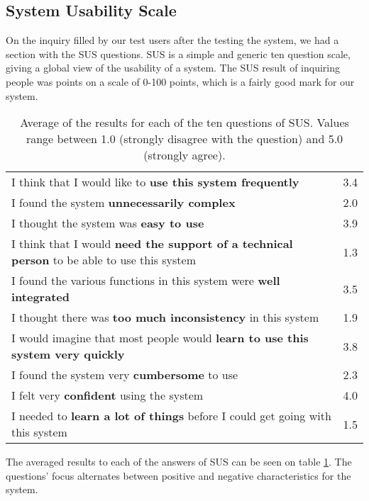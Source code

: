\subsection{System Usability Scale}

On the inquiry filled by our test users after the testing the system, we had a section with the \acf{SUS} questions. \ac{SUS}\cite{Brooke:1996ua} is a simple and generic ten question scale, giving a global view of the usability of a system. The \ac{SUS} result of inquiring  people was  points on a scale of 0-100 points, which is a fairly good mark for our system.

\begin{table}
	\renewcommand{\arraystretch}{1.5}
	\centering
\begin{tabular}{l|c}
I think that I would like to \textbf{use this system frequently} & 3.4\\
I found the system \textbf{unnecessarily complex} & 2.0\\
I thought the system was \textbf{easy to use} & 3.9\\
I think that I would \textbf{need the support of a technical person} to be able to use this system & 1.3\\
I found the various functions in this system were \textbf{well integrated} & 3.5\\
I thought there was \textbf{too much inconsistency} in this system & 1.9\\
I would imagine that most people would \textbf{learn to use this system very quickly} & 3.8\\
I found the system very \textbf{cumbersome} to use & 2.3\\
I felt very \textbf{confident} using the system & 4.0\\
I needed to \textbf{learn a lot of things} before I could get going with this system & 1.5\\
\end{tabular}
\caption{Average of the results for each of the ten questions of \ac{SUS}. Values range between 1.0 (strongly disagree with the question) and 5.0 (strongly agree).}
\label{tab:sus}
\vspace{\baselineskip}
\end{table}

The averaged results to each of the answers of \ac{SUS} can be seen on table \ref{tab:sus}. The questions' focus alternates between positive and negative characteristics for the system.

